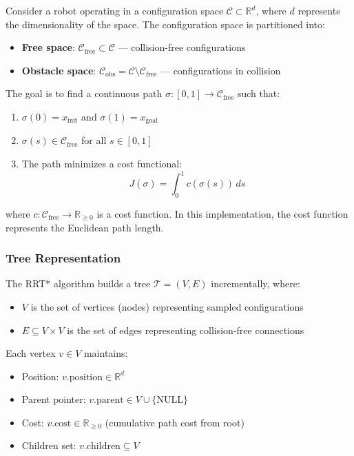 \documentclass[11pt]{article}
\newcommand{\R}{\mathbb{R}}
\newcommand{\Cfree}{\mathcal{C}_{\text{free}}}
\newcommand{\Cobs}{\mathcal{C}_{\text{obs}}}
\newcommand{\C}{\mathcal{C}}
\newcommand{\T}{\mathcal{T}}
\newcommand{\xinit}{x_{\text{init}}}
\newcommand{\xgoal}{x_{\text{goal}}}
\begin{document}
Consider a robot operating in a configuration space $\C \subset \R^d$, where $d$ represents the dimensionality of the space. The configuration space is partitioned into:

\begin{itemize}[noitemsep]
	\item \textbf{Free space}: $\Cfree \subset \C$ --- collision-free configurations
	\item \textbf{Obstacle space}: $\Cobs = \C \setminus \Cfree$ --- configurations in collision
\end{itemize}

The goal is to find a continuous path $\sigma: [0,1] \to \Cfree$ such that:
\begin{enumerate}[noitemsep]
	\item $\sigma(0) = \xinit$ and $\sigma(1) = \xgoal$
	\item $\sigma(s) \in \Cfree$ for all $s \in [0,1]$
	\item The path minimizes a cost functional: 
	\begin{equation}
		J(\sigma) = \int_0^1 c(\sigma(s)) \, ds
	\end{equation}
\end{enumerate}

\noindent where $c: \Cfree \to \R_{\geq 0}$ is a cost function. In this implementation, the cost function represents the Euclidean path length.

\subsubsection{Tree Representation}

The RRT* algorithm builds a tree $\T = (V, E)$ incrementally, where:
\begin{itemize}[noitemsep]
	\item $V$ is the set of vertices (nodes) representing sampled configurations
	\item $E \subseteq V \times V$ is the set of edges representing collision-free connections
\end{itemize}

Each vertex $v \in V$ maintains:
\begin{itemize}[noitemsep]
	\item Position: $v.\text{position} \in \R^d$
	\item Parent pointer: $v.\text{parent} \in V \cup \{\text{NULL}\}$
	\item Cost: $v.\text{cost} \in \R_{\geq 0}$ (cumulative path cost from root)
	\item Children set: $v.\text{children} \subseteq V$
\end{itemize}
\end{document}
